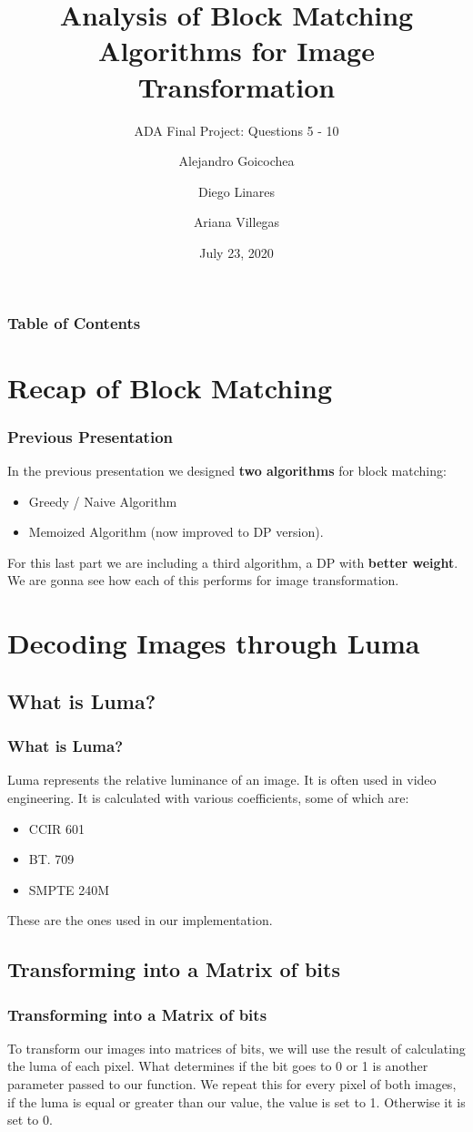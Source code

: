 \documentclass{beamer}
\title{Analysis of Block Matching Algorithms for Image Transformation}
\subtitle{ADA Final Project: Questions 5 - 10}
\author{Alejandro Goicochea\and Diego Linares\and Ariana Villegas}
\institute{\inst{}Universidad de Ingeniería y Tecnología}
\date{July 23, 2020}
\begin{document}
  \frame{\titlepage}
  \begin{frame}
    \frametitle{Table of Contents}
    \tableofcontents
  \end{frame}
  \section{Recap of Block Matching}
    \begin{frame}
      \frametitle{Previous Presentation}
      In the previous presentation we designed \textbf{two algorithms} for block matching:
      \begin{itemize}
        \item Greedy / Naive Algorithm
        \item Memoized Algorithm (now improved to DP version).
      \end{itemize}
      \medskip
      For this last part we are including a third algorithm, a DP with \textbf{better weight}.\\
      \medskip
      We are gonna see how each of this performs for image transformation. 
    \end{frame}
  \section{Decoding Images through Luma}
    \subsection{What is Luma?}
      \begin{frame}
        \frametitle{What is Luma?}
        Luma represents the relative luminance of an image. It is often used in video engineering.
        It is calculated with various coefficients, some of which are:
        \begin{itemize}
          \item CCIR 601
          \item BT. 709
          \item SMPTE 240M
        \end{itemize}
        \medskip
        These are the ones used in our implementation.\\
      \end{frame}
    \subsection{Transforming into a Matrix of bits}
      \begin{frame}
        \frametitle{Transforming into a Matrix of bits}
        To transform our images into matrices of bits, we will use the result of calculating the luma of 
        each pixel. What determines if the bit goes to 0 or 1 is another parameter passed to our function.
        \medskip
        We repeat this for every pixel of both images, if the luma is equal or greater than our value, 
        the value is set to 1. Otherwise it is set to 0.
      \end{frame}
\end{document}
